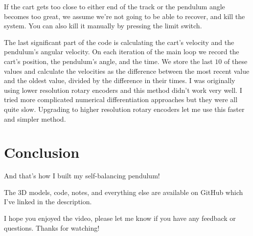 \documentclass{article}
\begin{document}
If the cart gets too close to either end of the track or the pendulum angle becomes too great, we assume we're not going to be able to recover, and kill the system. You can also kill it manually by pressing the limit switch.

The last significant part of the code is calculating the cart's velocity and the pendulum's angular velocity. On each iteration of the main loop we record the cart's position, the pendulum's angle, and the time. We store the last $10$ of these values and calculate the velocities as the difference between the most recent value and the oldest value, divided by the difference in their times. I was originally using lower resolution rotary encoders and this method didn't work very well. I tried more complicated numerical differentiation approaches but they were all quite slow. Upgrading to higher resolution rotary encoders let me use this faster and simpler method.

\section{Conclusion}

And that's how I built my self-balancing pendulum!

The 3D models, code, notes, and everything else are available on GitHub which I've linked in the description.

I hope you enjoyed the video, please let me know if you have any feedback or questions. Thanks for watching!
\end{document}
